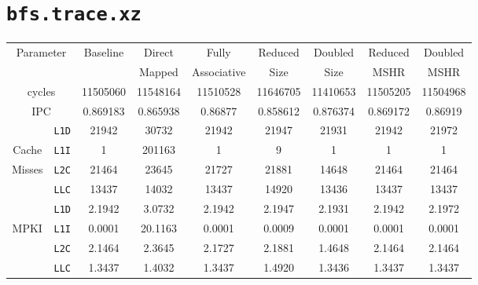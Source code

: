 \documentclass[11pt, swedish, openany]{book}
\begin{document}
\section{\texttt{bfs.trace.xz}}
\begin{table}[H]
    \begin{tabular}{||c|c||c||c|c||c|c||c|c||}
        \hline
        \multicolumn{2}{||c||}{\multirow{2}{*}{Parameter}} & \multirow{2}{*}{Baseline} & Direct   & Fully       & Reduced  & Doubled  & Reduced  & Doubled  \\
        \multicolumn{2}{||c||}{}                           &                           & Mapped   & Associative & Size     & Size     & MSHR     & MSHR     \\
        \hline
        \multicolumn{2}{||c||}{cycles}                     & 11505060                  & 11548164 & 11510528    & 11646705 & 11410653 & 11505205 & 11504968 \\
        \multicolumn{2}{||c||}{IPC}                        & 0.869183                  & 0.865938 & 0.86877     & 0.858612 & 0.876374 & 0.869172 & 0.86919  \\
        \hline
                                            & \texttt{L1D} & 21942                     & 30732    & 21942       & 21947    & 21931    & 21942    & 21972    \\
        Cache                               & \texttt{L1I} & 1                         & 201163   & 1           & 9        & 1        & 1        & 1        \\
        Misses                              & \texttt{L2C} & 21464                     & 23645    & 21727       & 21881    & 14648    & 21464    & 21464    \\
                                            & \texttt{LLC} & 13437                     & 14032    & 13437       & 14920    & 13436    & 13437    & 13437    \\
        \hline
                                            & \texttt{L1D} & 2.1942                    & 3.0732   & 2.1942      & 2.1947   & 2.1931   & 2.1942   & 2.1972   \\
        \multirow{2}{*}{MPKI}               & \texttt{L1I} & 0.0001                    & 20.1163  & 0.0001      & 0.0009   & 0.0001   & 0.0001   & 0.0001   \\
                                            & \texttt{L2C} & 2.1464                    & 2.3645   & 2.1727      & 2.1881   & 1.4648   & 2.1464   & 2.1464   \\
                                            & \texttt{LLC} & 1.3437                    & 1.4032   & 1.3437      & 1.4920   & 1.3436   & 1.3437   & 1.3437   \\

\end{tabular}
\end{table}
\end{document}
